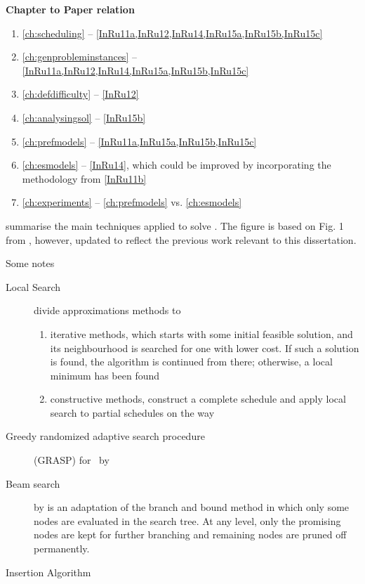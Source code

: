 
\clearpage

\noindent \textbf{Chapter to Paper relation}
\begin{enumerate}
  \item \cref{ch:scheduling} --
  \cref{InRu11a,InRu12,InRu14,InRu15a,InRu15b,InRu15c}
  \item \cref{ch:genprobleminstances} --
  \cref{InRu11a,InRu12,InRu14,InRu15a,InRu15b,InRu15c}
  \item \cref{ch:defdifficulty} -- \cref{InRu12}
  \item \cref{ch:analysingsol} -- \cref{InRu15b}
  \item \cref{ch:prefmodels} -- \cref{InRu11a,InRu15a,InRu15b,InRu15c}
  \item \cref{ch:esmodels} -- \cref{InRu14}, which could be improved by 
  incorporating the methodology from \cref{InRu11b}
  \item \cref{ch:experiments} -- \cref{ch:prefmodels} vs. \cref{ch:esmodels}
\end{enumerate}

 summarise the main techniques applied to solve \JSP. The 
figure is based on Fig. 1 from \citet{Jain99}, however, updated to reflect the 
previous work relevant to this dissertation.

Some notes
\begin{description}
  \item[Local Search] \cite{LocalSearch} divide approximations methods to 
  \begin{enumerate}
    \item iterative methods, which starts with some initial feasible 
    solution, and its neighbourhood is searched for one with lower cost. If 
    such a solution is found, the algorithm is
    continued from there; otherwise, a local minimum has been found
    \item constructive methods, construct a complete schedule and apply 
    local search to partial schedules on the way
  \end{enumerate}
  \item[Greedy randomized adaptive search procedure] (GRASP) for \JSP\ by 
  \cite{GRASP}
  \item[Beam search] by \cite{BeamSearch} is an adaptation of the branch and 
  bound method in which only some nodes are evaluated in the search tree. At 
  any level, only the promising nodes are kept for further branching and 
  remaining nodes are pruned off permanently.
  \item[Insertion Algorithm] \cite{InsertionAlg} 
\end{description}




